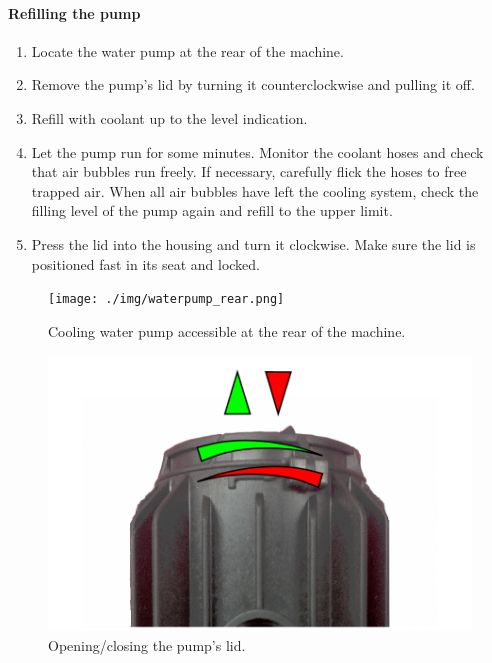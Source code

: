 \paragraph{Refilling the pump}

\begin{enumerate}
  \item Locate the water pump at the rear of the machine.
  \item Remove the pump's lid by turning it counterclockwise and pulling it off.
  \item Refill with coolant up to the level indication.
  \item Let the pump run for some minutes. Monitor the coolant hoses and check that air bubbles run freely.
        If necessary, carefully flick the hoses to free trapped air. When all air bubbles have left the cooling system, check the filling level of the pump again and refill to the upper limit.
  \item Press the lid into the housing and turn it clockwise. Make sure the lid is positioned fast 
        in its seat and locked.
\end{enumerate}

\begin{figure}[H]
  \centering
  \texttt{[image: ./img/waterpump\_rear.png]}
  \caption{Cooling water pump accessible at the rear of the machine.}    
\end{figure}

\begin{figure}[H]
  \centering
  \includegraphics[width=.7\linewidth]{./img/mtc_coolingwaterpumpopenlid.png}
  \caption{Opening/closing the pump's lid.}
\end{figure}

